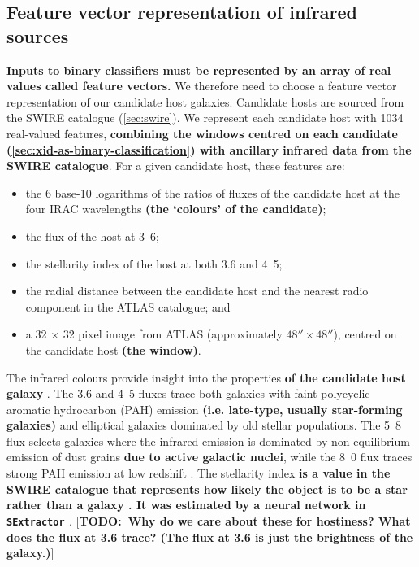 \documentclass[fleqn,usenatbib,usedcolumn]{mnras}
\newcommand{\todo}[1]{ {\color{red}[{\bf TODO:~{#1}}]} }
\newcommand{\edited}[1]{{\bf {#1}}}
\begin{document}
  \subsection{Feature vector representation of infrared sources}
  \label{vector-representation-of-infrared-sources}

    \edited{Inputs to binary classifiers must be represented by an array of real values called feature vectors.} We therefore need to choose a feature vector representation of our candidate host galaxies. Candidate hosts are sourced from the SWIRE catalogue (\autoref{sec:swire}). We represent each candidate host with 1034 real-valued features, \edited{combining the windows centred on each candidate (\autoref{sec:xid-as-binary-classification}) with ancillary infrared data from the SWIRE catalogue}. For a given candidate host, these features are:
    \begin{itemize}
      \item the 6 base-10 logarithms of the ratios of fluxes of the candidate
        host at the four IRAC wavelengths \edited{(the `colours' of the candidate)};
      \item the flux of the host at \unit{3.6}{\micro\meter};
      \item the stellarity index of the host at both 3.6 and
        \unit{4.5}{\micro\meter};
      \item the radial distance between the candidate host and the nearest
        radio component in the ATLAS catalogue; and
      \item a 32 $\times$ 32 pixel image from ATLAS (approximately $48''
        \times 48''$), centred on the candidate host \edited{(the window)}.
    \end{itemize}

    The infrared colours provide insight into the properties \edited{of the candidate
    host galaxy} \citep{grant11polarised}. The 3.6 and \unit{4.5}{\micro\meter} fluxes trace
    both galaxies with faint polycyclic aromatic hydrocarbon (PAH) emission \edited{(i.e. late-type, usually star-forming galaxies)}
    and elliptical galaxies dominated by old stellar populations. The
    \unit{5.8}{\micro\meter} flux selects galaxies where the infrared emission
    is dominated by non-equilibrium emission of dust grains \edited{due to active galactic nuclei},
    while the \unit{8.0}{\micro\meter} flux
    traces strong PAH emission at low redshift \citep{Sajina2005}. The
    stellarity index \edited{is a value in the SWIRE catalogue that represents how likely the object is to be a star rather
    than a galaxy \citep{surace05swire}. It was estimated by a neural network in
    \texttt{SExtractor} \citep{bertin96sextractor}}. \todo{Why do we care about these for hostiness?
    What does the flux at 3.6 trace? (The flux at 3.6 is just the brightness of the galaxy.)}
\end{document}
